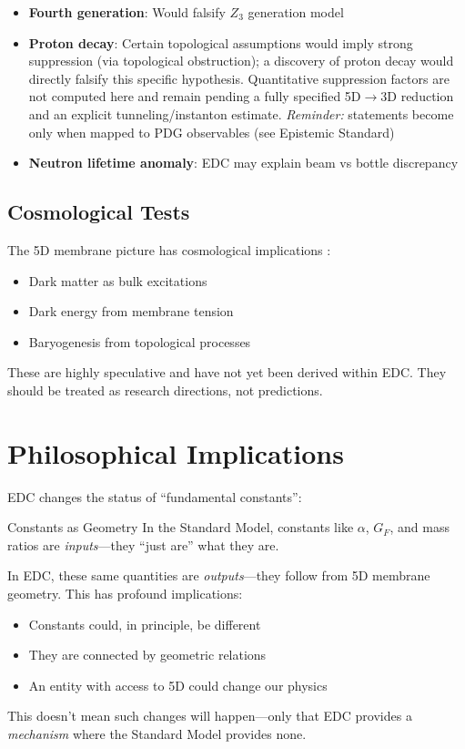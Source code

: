 \begin{itemize}[nosep]
\item \textbf{Fourth generation}: Would falsify $Z_3$ generation model
\item \textbf{Proton decay}: Certain topological assumptions \tagP{} would imply
      strong suppression (via topological obstruction); a discovery of proton decay
      would directly falsify this specific hypothesis.
      Quantitative suppression factors are not computed here and remain \tagOpen{}
      pending a fully specified 5D$\to$3D reduction and an explicit tunneling/instanton
      estimate. \emph{Reminder:} statements become \tagDc{} only when mapped to PDG
      observables (see Epistemic Standard)
\item \textbf{Neutron lifetime anomaly}: EDC may explain beam vs bottle discrepancy
\end{itemize}

\subsection{Cosmological Tests}

The 5D membrane picture has cosmological implications \tagP{}:
\begin{itemize}[nosep]
\item Dark matter as bulk excitations \tagI{}
\item Dark energy from membrane tension \tagI{}
\item Baryogenesis from topological processes \tagI{}
\end{itemize}

These are highly speculative and have not yet been derived within EDC.
They should be treated as research directions, not predictions.

\section{Philosophical Implications}

EDC changes the status of ``fundamental constants'':

\begin{statusbox}{Constants as Geometry}
In the Standard Model, constants like $\alpha$, $G_F$, and mass ratios
are \textit{inputs}---they ``just are'' what they are.

In EDC, these same quantities are \textit{outputs}---they follow from
5D membrane geometry. This has profound implications:

\begin{itemize}[nosep]
\item Constants could, in principle, be different
\item They are connected by geometric relations
\item An entity with access to 5D could change our physics
\end{itemize}

This doesn't mean such changes will happen---only that EDC provides
a \textit{mechanism} where the Standard Model provides none.
\end{statusbox}

